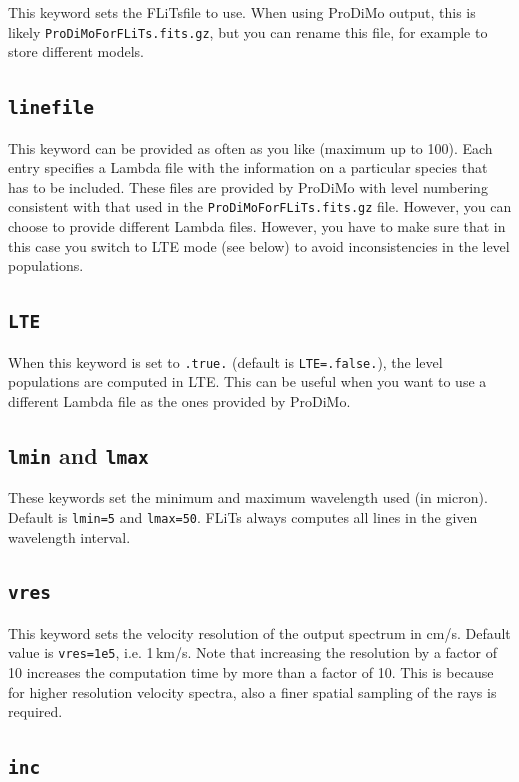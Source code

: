 \documentclass[12pt]{article}
\begin{document}
This keyword sets the FLiTsfile to use. When using ProDiMo output, this is likely \texttt{ProDiMoForFLiTs.fits.gz}, but you can rename this file, for example to store different models.

\subsection*{\texttt{linefile}}

This keyword can be provided as often as you like (maximum up to 100). Each entry specifies a Lambda file with the information on a particular species that has to be included. These files are provided by ProDiMo with level numbering consistent with that used in the \texttt{ProDiMoForFLiTs.fits.gz} file. However, you can choose to provide different Lambda files. However, you have to make sure that in this case you switch to LTE mode (see below) to avoid inconsistencies in the level populations.

\subsection*{\texttt{LTE}}

When this keyword is set to \texttt{.true.} (default is \texttt{LTE=.false.}), the level populations are computed in LTE. This can be useful when you want to use a different Lambda file as the ones provided by ProDiMo.

\subsection*{\texttt{lmin} and \texttt{lmax}}

These keywords set the minimum and maximum wavelength used (in micron). Default is \texttt{lmin=5} and \texttt{lmax=50}. FLiTs always computes all lines in the given wavelength interval.

\subsection*{\texttt{vres}}

This keyword sets the velocity resolution of the output spectrum in cm/s. Default value is \texttt{vres=1e5}, i.e. 1\,km/s. Note that increasing the resolution by a factor of 10 increases the computation time by more than a factor of 10. This is because for higher resolution velocity spectra, also a finer spatial sampling of the rays is required.

\subsection*{\texttt{inc}}
\end{document}
